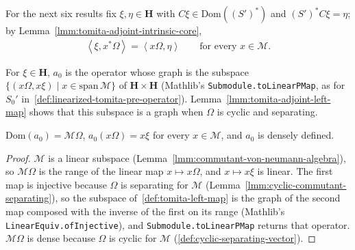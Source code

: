 For the next six results fix $\xi, \eta \in \mathbf{H}$ with $C\xi \in \text{Dom}((S')^*)$ and $(S')^*C\xi = \eta$; by Lemma~\ref{lmm:tomita-adjoint-intrinsic-core},
\begin{align}
    \left< \xi, x^*\Omega \right> = \left< x\Omega, \eta \right> \qquad \text{for every } x \in \mathcal{M}. \label{eq:tomita-adjoint-pair}
\end{align}

\begin{definition}
    \label{def:tomita-left-map}
    \leanok
    For $\xi \in \mathbf{H}$, $a_0$ is the operator whose graph is the subspace $\{ (x\Omega, x\xi) \mid x \in \text{span}\,\mathcal{M} \}$ of $\mathbf{H} \times \mathbf{H}$ (Mathlib's \texttt{Submodule.toLinearPMap}, as for $S_0'$ in~\ref{def:linearized-tomita-pre-operator}). Lemma~\ref{lmm:tomita-adjoint-left-map} shows that this subspace is a graph when $\Omega$ is cyclic and separating.
\end{definition}

\begin{lemma}
    \label{lmm:tomita-adjoint-left-map}
    \leanok
    $\text{Dom}(a_0) = \mathcal{M}\Omega$, $a_0(x\Omega) = x\xi$ for every $x \in \mathcal{M}$, and $a_0$ is densely defined.
\end{lemma}
\begin{proof}
    \leanok
    $\mathcal{M}$ is a linear subspace (Lemma~\ref{lmm:commutant-von-neumann-algebra}), so $\mathcal{M}\Omega$ is the range of the linear map $x \mapsto x\Omega$, and $x \mapsto x\xi$ is linear. The first map is injective because $\Omega$ is separating for $\mathcal{M}$ (Lemma~\ref{lmm:cyclic-commutant-separating}), so the subspace of~\ref{def:tomita-left-map} is the graph of the second map composed with the inverse of the first on its range (Mathlib's \texttt{LinearEquiv.ofInjective}), and \texttt{Submodule.toLinearPMap} returns that operator. $\mathcal{M}\Omega$ is dense because $\Omega$ is cyclic for $\mathcal{M}$ (\ref{def:cyclic-separating-vector}).
\end{proof}

